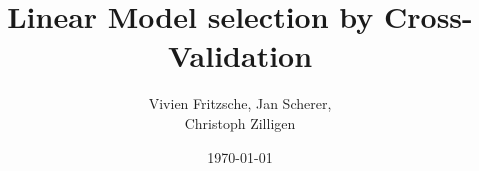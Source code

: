 \documentclass{beamer}
\title[Cross Validation]{\huge Linear Model selection by Cross-Validation}
\author{  Vivien Fritzsche, Jan Scherer, \\ Christoph Zilligen}
\date{ \today}
\begin{document}
\beamertemplatenavigationsymbolsempty
\begin{frame}
\titlepage
\end{frame}
\end{document}
